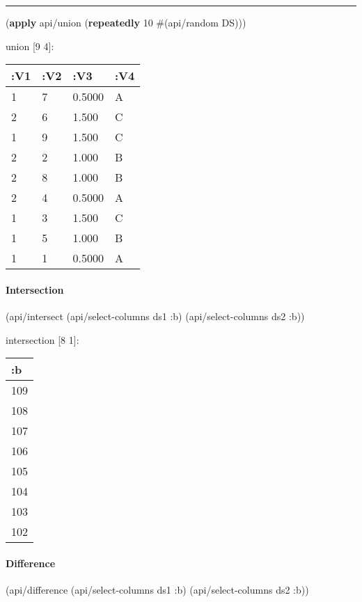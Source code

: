 \documentclass[]{article}
\newenvironment{Shaded}{\begin{snugshade}}{\end{snugshade}}
\newcommand{\KeywordTok}[1]{\textcolor[rgb]{0.13,0.29,0.53}{\textbf{#1}}}
\newcommand{\DecValTok}[1]{\textcolor[rgb]{0.00,0.00,0.81}{#1}}
\newcommand{\AttributeTok}[1]{\textcolor[rgb]{0.77,0.63,0.00}{#1}}
\newcommand{\NormalTok}[1]{#1}
\let\oldparagraph\paragraph
\renewcommand{\paragraph}[1]{\oldparagraph{#1}\mbox{}}
\begin{document}
\begin{center}\rule{0.5\linewidth}{0.5pt}\end{center}

\begin{Shaded}
\begin{Highlighting}[]
\NormalTok{(}\KeywordTok{apply}\NormalTok{ api/union (}\KeywordTok{repeatedly} \DecValTok{10}\NormalTok{ #(api/random DS)))}
\end{Highlighting}
\end{Shaded}

union {[}9 4{]}:

\begin{longtable}[]{@{}llll@{}}
\toprule
:V1 & :V2 & :V3 & :V4\tabularnewline
\midrule
\endhead
1 & 7 & 0.5000 & A\tabularnewline
2 & 6 & 1.500 & C\tabularnewline
1 & 9 & 1.500 & C\tabularnewline
2 & 2 & 1.000 & B\tabularnewline
2 & 8 & 1.000 & B\tabularnewline
2 & 4 & 0.5000 & A\tabularnewline
1 & 3 & 1.500 & C\tabularnewline
1 & 5 & 1.000 & B\tabularnewline
1 & 1 & 0.5000 & A\tabularnewline
\bottomrule
\end{longtable}

\paragraph{Intersection}\label{intersection}

\begin{Shaded}
\begin{Highlighting}[]
\NormalTok{(api/intersect (api/select-columns ds1 }\AttributeTok{:b}\NormalTok{)}
\NormalTok{               (api/select-columns ds2 }\AttributeTok{:b}\NormalTok{))}
\end{Highlighting}
\end{Shaded}

intersection {[}8 1{]}:

\begin{longtable}[]{@{}l@{}}
\toprule
:b\tabularnewline
\midrule
\endhead
109\tabularnewline
108\tabularnewline
107\tabularnewline
106\tabularnewline
105\tabularnewline
104\tabularnewline
103\tabularnewline
102\tabularnewline
\bottomrule
\end{longtable}

\paragraph{Difference}\label{difference}

\begin{Shaded}
\begin{Highlighting}[]
\NormalTok{(api/difference (api/select-columns ds1 }\AttributeTok{:b}\NormalTok{)}
\NormalTok{                (api/select-columns ds2 }\AttributeTok{:b}\NormalTok{))}
\end{Highlighting}
\end{Shaded}
\end{document}
